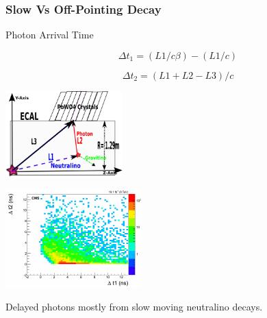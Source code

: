 \documentclass{beamer}
\begin{document}
\begin{frame}
\frametitle{\huge{Slow Vs Off-Pointing Decay}}
  \begin{minipage}[t]{0.7\paperwidth}
    \begin{multicols}{2}
      \begin{varblock}[3.5cm]{Photon Arrival Time}
         
          $$\Delta t_{1} = (L1/c\beta) - (L1/c)$$
    
          $$\Delta t_{2} = (L1 + L2 - L3)/c $$   
           
      \end{varblock}
     \columnbreak
     \includegraphics[height=3.30cm, width=0.4\paperwidth]{THESISPLOTS/DelayedPhoton-ECAL.png}
     
    \end{multicols} 
  \end{minipage}
  
  \begin{minipage}[t]{0.8\paperwidth}
    \includegraphics[height=3.8cm, width=0.7\paperwidth]{THESISPLOTS/dt1_dt2_late.png}
  \end{minipage}
  \vspace{-0.1cm}
  Delayed photons mostly from slow moving neutralino decays.

\end{frame}





\end{document}
